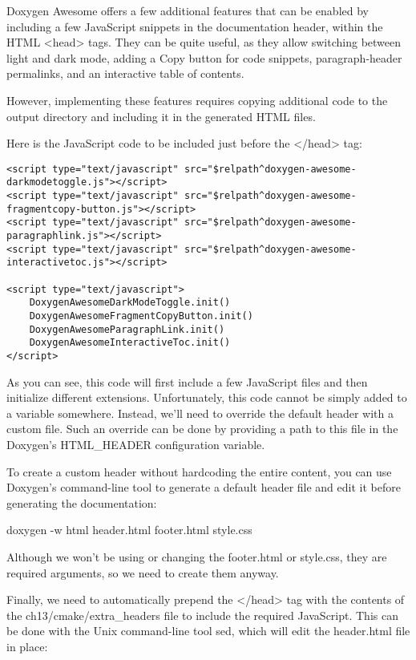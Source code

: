 Doxygen Awesome offers a few additional features that can be enabled by including a few JavaScript snippets in the documentation header, within the HTML <head> tags. They can be quite useful, as they allow switching between light and dark mode, adding a Copy button for code snippets, paragraph-header permalinks, and an interactive table of contents.

However, implementing these features requires copying additional code to the output directory and including it in the generated HTML files.

Here is the JavaScript code to be included just before the </head> tag:


\begin{verbatim}
<script type="text/javascript" src="$relpath^doxygen-awesome-darkmodetoggle.js"></script>
<script type="text/javascript" src="$relpath^doxygen-awesome-fragmentcopy-button.js"></script>
<script type="text/javascript" src="$relpath^doxygen-awesome-paragraphlink.js"></script>
<script type="text/javascript" src="$relpath^doxygen-awesome-interactivetoc.js"></script>

<script type="text/javascript">
    DoxygenAwesomeDarkModeToggle.init()
    DoxygenAwesomeFragmentCopyButton.init()
    DoxygenAwesomeParagraphLink.init()
    DoxygenAwesomeInteractiveToc.init()
</script>
\end{verbatim}

As you can see, this code will first include a few JavaScript files and then initialize different extensions. Unfortunately, this code cannot be simply added to a variable somewhere. Instead, we’ll need to override the default header with a custom file. Such an override can be done by providing a path to this file in the Doxygen’s HTML\_HEADER configuration variable.

To create a custom header without hardcoding the entire content, you can use Doxygen’s command-line tool to generate a default header file and edit it before generating the documentation:

\begin{shell}
doxygen -w html header.html footer.html style.css
\end{shell}

Although we won’t be using or changing the footer.html or style.css, they are required arguments, so we need to create them anyway.

Finally, we need to automatically prepend the </head> tag with the contents of the ch13/cmake/extra\_headers file to include the required JavaScript. This can be done with the Unix command-line tool sed, which will edit the header.html file in place:

